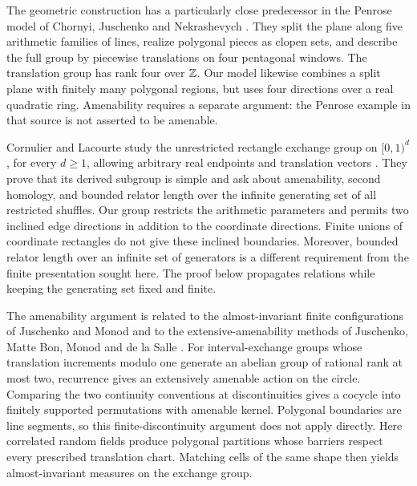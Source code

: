 The geometric construction has a particularly close predecessor
in the Penrose model of Chornyi, Juschenko and Nekrashevych
\cite[Section~4 in the author version]{ChornyiJuschenkoNekrashevych2020}.
They split the plane along five arithmetic families of lines, realize
polygonal pieces as clopen sets, and describe the full group by
piecewise translations on four pentagonal windows. The translation
group has rank four over $\mathbb Z$. Our model likewise combines a split
plane with finitely many polygonal regions, but uses four directions
over a real quadratic ring. Amenability requires a separate argument:
the Penrose example in that source is not asserted to be amenable.

Cornulier and Lacourte study the unrestricted rectangle exchange
group on $[0,1)^d$, for every $d\geq1$, allowing arbitrary real
endpoints and translation vectors \cite{CornulierLacourte2025}.
They prove that its derived subgroup is simple and ask about
amenability, second homology, and bounded relator length over the
infinite generating set of all restricted shuffles. Our group
restricts the arithmetic parameters and permits two inclined edge
directions in addition to the coordinate directions. Finite unions
of coordinate rectangles do not give these inclined boundaries.
Moreover, bounded relator length over an infinite set of generators
is a different requirement from the finite presentation sought here.
The proof below propagates relations while keeping the generating
set fixed and finite.

The amenability argument is related to the almost-invariant finite
configurations of Juschenko and Monod
\cite[Theorem~C]{JuschenkoMonod2013} and to the extensive-amenability
methods of Juschenko, Matte Bon, Monod and de la Salle
\cite[Section~5]{JuschenkoMatteBonMonodDeLaSalle2018}.
For interval-exchange groups whose translation increments modulo
one generate an abelian group of rational rank at most two,
recurrence gives an extensively amenable action on the circle.
Comparing the two continuity conventions at discontinuities gives
a cocycle into finitely supported permutations with amenable
kernel. Polygonal boundaries
are line segments, so this finite-discontinuity argument does not
apply directly. Here correlated random fields produce polygonal
partitions whose barriers respect every prescribed translation
chart. Matching cells of the same shape then yields almost-invariant
measures on the exchange group.


